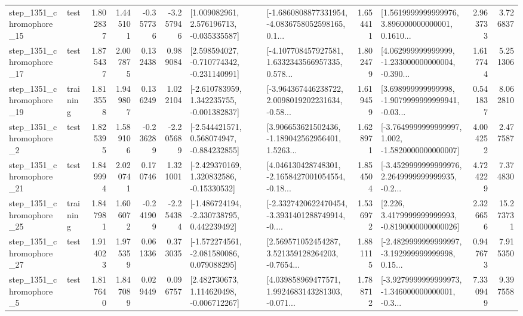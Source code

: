 \begin{tabular}{llrrrrllrlrr}
 step\_1351\_chromophore\_15 &      test &      1.802837 &    1.445101 &     -0.357736 & -3.257946 &    [1.009082961, 2.576196713, -0.035335587] &  [-1.6860808877331954, -4.0836758052598165, 0.1... &       1.654411 &  [1.5619999999999976, 3.896000000000001, 0.1610... &            2.963733 &          3.726837 \\
 step\_1351\_chromophore\_17 &      test &      1.875437 &    2.007875 &      0.132438 &  0.989084 &   [2.598594027, -0.710774342, -0.231140991] &  [-4.107708457927581, 1.6332343566957335, 0.578... &       1.802479 &  [4.062999999999999, -1.233000000000004, -0.390... &            1.617744 &          5.251306 \\
 step\_1351\_chromophore\_19 &  training &      1.813558 &    1.949807 &      0.136249 &  1.022104 &   [-2.610783959, 1.342235755, -0.001382837] &  [-3.964367446238722, 2.0098019202231634, -0.58... &       1.619459 &  [3.698999999999998, -1.9079999999999941, -0.03... &            0.541837 &          8.062810 \\
  step\_1351\_chromophore\_2 &      test &      1.825395 &    1.589106 &     -0.236289 & -2.205689 &   [-2.544421571, 0.568074947, -0.884232855] &  [3.906653621502436, -1.189042562956401, 1.5263... &       1.628971 &  [-3.7649999999999997, 1.002, -1.5820000000000007] &            4.004252 &          2.477587 \\
 step\_1351\_chromophore\_21 &      test &      1.849994 &    2.020741 &      0.170746 &  1.321001 &    [-2.429370169, 1.320832586, -0.15330532] &  [4.046130428748301, -2.1658427001054554, -0.18... &       1.854504 &  [-3.4529999999999976, 2.2649999999999935, -0.2... &            4.724229 &          7.374830 \\
 step\_1351\_chromophore\_25 &  training &      1.847981 &    1.606072 &     -0.241909 & -2.254384 &   [-1.486724194, -2.330738795, 0.442239492] &  [-2.3327420622470454, -3.3931401288749914, -0.... &       1.536972 &   [2.226, 3.4179999999999993, -0.8190000000000026] &            2.326656 &         15.273731 \\
 step\_1351\_chromophore\_27 &      test &      1.914023 &    1.975359 &      0.061336 &  0.373035 &   [-1.572274561, -2.081580086, 0.079088295] &  [2.569571052454287, 3.521359128264203, -0.7654... &       1.881115 &  [-2.4829999999999997, -3.192999999999998, 0.15... &            0.947673 &          7.915350 \\
  step\_1351\_chromophore\_5 &      test &      1.817640 &    1.847089 &      0.029449 &  0.096757 &    [2.482730673, 1.114620498, -0.006712267] &  [4.039858969477571, 1.9924683143281303, -0.071... &       1.788712 &  [-3.9279999999999973, -1.346000000000001, -0.3... &            7.330949 &          9.397558 \\

\end{tabular}
